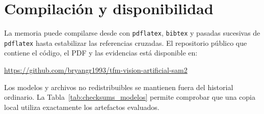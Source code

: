 \section{Compilación y disponibilidad}

La memoria puede compilarse desde  con \texttt{pdflatex}, \texttt{bibtex} y pasadas sucesivas de \texttt{pdflatex} hasta estabilizar las referencias cruzadas. El repositorio público que contiene el código, el PDF y las evidencias está disponible en:

\begin{center}
\small\url{https://github.com/bryangr1993/tfm-vision-artificial-sam2}
\end{center}

Los modelos y archivos no redistribuibles se mantienen fuera del historial ordinario. La Tabla~\ref{tab:checksums_modelos} permite comprobar que una copia local utiliza exactamente los artefactos evaluados.
